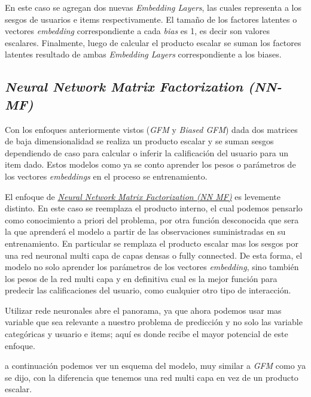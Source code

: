 \documentclass[11pt,a4paper,twoside]{thesis}
\begin{document}
En este caso se agregan dos nuevas \textit{Embedding Layers}, las cuales representa a los sesgos de usuarios e items respectivamente. El tamaño de los factores latentes o vectores \textit{embedding} correspondiente a cada \textit{bias} es 1, es decir son valores escalares. Finalmente, luego de calcular el producto escalar se suman los factores latentes resultado de ambas \textit{Embedding Layers} correspondiente a los biases.  


\subsection{\textit{Neural Network Matrix Factorization (NN-MF)}}

Con los enfoques anteriormente vistos (\textit{GFM} y \textit{Biased GFM}) dada dos matrices de baja dimensionalidad se realiza un producto escalar y se suman sesgos dependiendo de caso para calcular o inferir la calificación del usuario para un item dado. Estos modelos como ya se conto aprender los pesos o parámetros de los vectores \textit{embeddings} en el proceso se entrenamiento. 

El enfoque de \href{https://arxiv.org/pdf/1511.06443.pdf}{\textit{Neural Network Matrix Factorization (NN MF)}} es levemente distinto. En este caso se reemplaza el producto interno, el cual podemos pensarlo como conocimiento a priori del problema, por otra función desconocida que sera la que aprenderá el modelo a partir de las observaciones suministradas en su entrenamiento. En particular se remplaza el producto escalar mas los sesgos por una red neuronal multi capa de capas densas o fully connected. De esta forma, el modelo no solo aprender los parámetros de los vectores \textit{embedding}, sino también los pesos de la red multi capa y en definitiva cual es la mejor función para predecir las calificaciones del usuario, como cualquier otro tipo de interacción.

Utilizar rede neuronales abre el panorama, ya que ahora podemos usar mas variable que sea relevante a nuestro problema de predicción y no solo las variable categóricas y usuario e items; aquí es donde recibe el mayor potencial de este enfoque.

a continuación podemos ver un esquema del modelo, muy similar a \textit{GFM} como ya se dijo, con la diferencia que tenemos una red multi capa en vez de un producto escalar.
\end{document}
